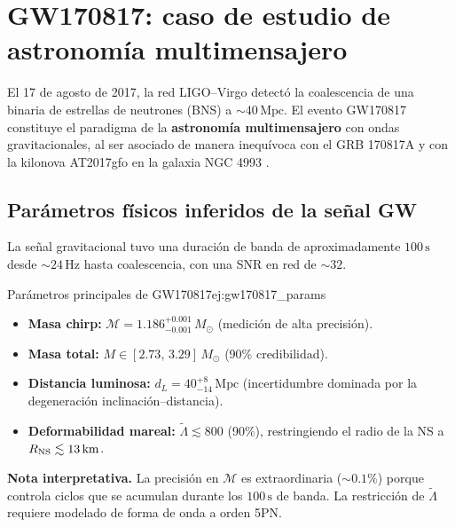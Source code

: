 \section{GW170817: caso de estudio de astronomía multimensajero}
\label{sec:gw170817}

El 17 de agosto de 2017, la red LIGO--Virgo detectó la coalescencia de una binaria de estrellas de neutrones (BNS) a $\sim 40\,\mathrm{Mpc}$. El evento GW170817 constituye el paradigma de la \textbf{astronomía multimensajero} con ondas gravitacionales, al ser asociado de manera inequívoca con el GRB 170817A y con la kilonova AT2017gfo en la galaxia NGC 4993 \cite{Abbott2017BNS, Abbott2017multimessenger, Abbott2017H0}.

\subsection{Parámetros físicos inferidos de la señal GW}

La señal gravitacional tuvo una duración de banda de aproximadamente $100\,\mathrm{s}$ desde $\sim 24\,\mathrm{Hz}$ hasta coalescencia, con una SNR en red de $\sim 32$.

\begin{ejemplo}{Parámetros principales de GW170817}{ej:gw170817_params}
\begin{itemize}[leftmargin=2em]
  \item \textbf{Masa chirp:} $\mathcal{M} = 1.186^{+0.001}_{-0.001}\,M_\odot$ (medición de alta precisión).
  \item \textbf{Masa total:} $M \in [2.73,\,3.29]\,M_\odot$ (90\% credibilidad).
  \item \textbf{Distancia luminosa:} $d_L = 40^{+8}_{-14}\,\mathrm{Mpc}$ (incertidumbre dominada por la degeneración inclinación--distancia).
  \item \textbf{Deformabilidad mareal:} $\tilde\Lambda \lesssim 800$ (90\%), restringiendo el radio de la NS a $R_{\rm NS} \lesssim 13\,\mathrm{km}$.
\end{itemize}

\textbf{Nota interpretativa.} La precisión en $\mathcal{M}$ es extraordinaria ($\sim 0.1\%$) porque controla ciclos que se acumulan durante los $100\,\mathrm{s}$ de banda. La restricción de $\tilde\Lambda$ requiere modelado de forma de onda a orden 5PN.
\end{ejemplo}

